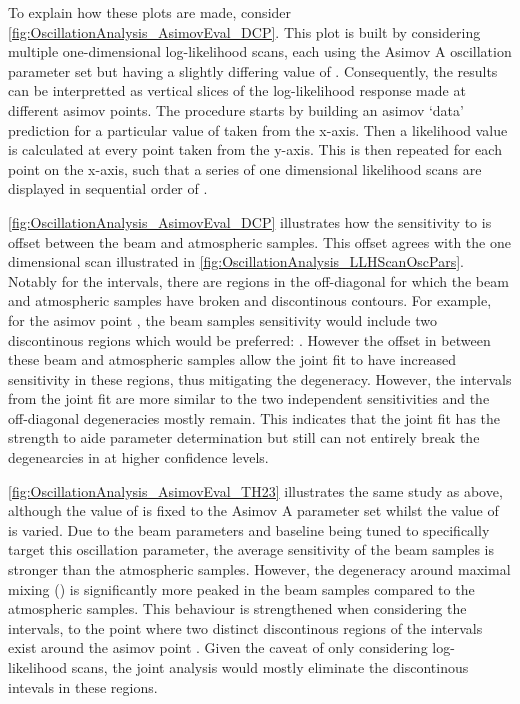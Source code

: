 To explain how these plots are made, consider \autoref{fig:OscillationAnalysis_AsimovEval_DCP}. This plot is built by considering multiple one-dimensional log-likelihood scans, each using the Asimov A oscillation parameter set but having a slightly differing value of \dcp. Consequently, the results can be interpretted as vertical slices of the log-likelihood response made at different asimov points. The procedure starts by building an asimov `data' prediction for a particular value of \dcp taken from the x-axis. Then a likelihood value is calculated at every \dcp point taken from the y-axis. This is then repeated for each point on the x-axis, such that a series of one dimensional likelihood scans are displayed in sequential order of \dcp.

\autoref{fig:OscillationAnalysis_AsimovEval_DCP} illustrates how the sensitivity to \dcp is offset between the beam and atmospheric samples. This offset agrees with the one dimensional scan illustrated in \autoref{fig:OscillationAnalysis_LLHScanOscPars}. Notably for the \quickmath{1\sigma} intervals, there are regions in the off-diagonal for which the beam and atmospheric samples have broken and discontinous contours. For example, for the asimov point , the beam samples sensitivity would include two discontinous regions which would be preferred: . However the offset in \dcp between these beam and atmospheric samples allow the joint fit to have increased sensitivity in these regions, thus mitigating the degeneracy. However, the \quickmath{2\sigma} intervals from the joint fit are more similar to the two independent sensitivities and the off-diagonal degeneracies mostly remain. This indicates that the joint fit has the strength to aide parameter determination but still can not entirely break the degenearcies in \dcp at higher confidence levels. 

\autoref{fig:OscillationAnalysis_AsimovEval_TH23} illustrates the same study as above, although the value of \dcp is fixed to the Asimov A parameter set whilst the value of \sinsqatm is varied. Due to the beam parameters and baseline being tuned to specifically target this oscillation parameter, the average sensitivity of the beam samples is stronger than the atmospheric samples. However, the degeneracy around maximal mixing () is significantly more peaked in the beam samples compared to the atmospheric samples. This behaviour is strengthened when considering the \quickmath{2\sigma} intervals, to the point where two distinct discontinous regions of the \quickmath{2\sigma} intervals exist around the asimov point . Given the caveat of only considering log-likelihood scans, the joint analysis would mostly eliminate the discontinous intevals in these regions.

